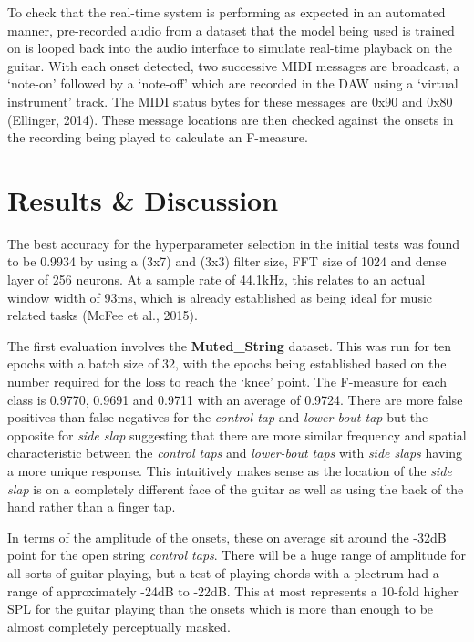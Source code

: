 \documentclass[conference]{IEEEtran}
\begin{document}
To check that the real-time system is performing as expected in an automated manner, pre-recorded audio from a dataset that the model being used is trained on is looped back into the audio interface to simulate real-time playback on the guitar. With each onset detected, two successive MIDI messages are broadcast, a `note-on'
followed by a `note-off' which are recorded in the DAW using a `virtual instrument' track. The MIDI status bytes for these messages are 0x90 and 0x80 (Ellinger, 2014). These message locations are then checked against the onsets in the recording being played to calculate an F-measure.


\section{Results \& Discussion}
The best accuracy for the hyperparameter selection in the initial tests was found to be 0.9934 by using a (3x7) and (3x3) filter size, FFT size of 1024 and dense layer of 256 neurons.
At a sample rate of 44.1kHz, this relates to an actual window width of 93ms, which is already established as being ideal for music related tasks (McFee et al., 2015). 

The first evaluation involves the \textbf{Muted\_String} dataset. This was run for ten epochs with a batch size of 32, with the epochs being established based on the number required for the loss to reach the `knee' point. 
The F-measure for each class is 0.9770, 0.9691 and 0.9711 with an average of 0.9724.
There are more false positives than false negatives for the \emph{control tap} and \emph{lower-bout tap} but the opposite for \emph{side slap} suggesting that there are more similar frequency and spatial characteristic
between the \emph{control taps} and \emph{lower-bout taps} with \emph{side slaps} having a more unique response. This intuitively makes sense as the location of the \emph{side slap} is on a completely different face of
the guitar as well as using the back of the hand rather than a finger tap. 

In terms of the amplitude of the onsets, these on average sit around the -32dB point for the open string \emph{control taps}. There will be a huge range of amplitude for all sorts of guitar playing, but a test of playing chords 
with a plectrum had a range of approximately -24dB to -22dB. This at most represents a 10-fold higher SPL for the guitar playing than the onsets which is more than enough to be almost completely perceptually masked.
\end{document}
